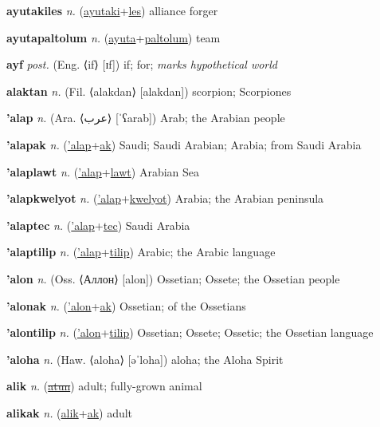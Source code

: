 \textbf{\hypertarget{ayutakiles}{ayutakiles}} \textit{n.} (\hyperlink{ayutaki}{ayutaki}+\allowbreak \hyperlink{les}{les})
alliance forger

\textbf{\hypertarget{ayutapaltolum}{ayutapaltolum}} \textit{n.} (\hyperlink{ayuta}{ayuta}+\allowbreak \hyperlink{paltolum}{paltolum})
team

\textbf{\hypertarget{ayf}{ayf}} \textit{post.} (Eng. ⟨if⟩ [ɪf])
if; for; \textit{marks hypothetical world}

\textbf{\hypertarget{alaktan}{alaktan}} \textit{n.} (Fil. ⟨alakdan⟩ [alakdan])
scorpion; Scorpiones

\textbf{\hypertarget{'alap}{'alap}} \textit{n.} (Ara. ⟨{\arabics{}عرب}⟩ [ˈʕarab])
Arab; the Arabian people

\textbf{\hypertarget{'alapak}{'alapak}} \textit{n.} (\hyperlink{'alap}{'alap}+\allowbreak \hyperlink{ak}{ak})
Saudi; Saudi Arabian; Arabia; from Saudi Arabia

\textbf{\hypertarget{'alaplawt}{'alaplawt}} \textit{n.} (\hyperlink{'alap}{'alap}+\allowbreak \hyperlink{lawt}{lawt})
Arabian Sea

\textbf{\hypertarget{'alapkwelyot}{'alapkwelyot}} \textit{n.} (\hyperlink{'alap}{'alap}+\allowbreak \hyperlink{kwelyot}{kwelyot})
Arabia; the Arabian peninsula

\textbf{\hypertarget{'alaptec}{'alaptec}} \textit{n.} (\hyperlink{'alap}{'alap}+\allowbreak \hyperlink{tec}{tec})
Saudi Arabia

\textbf{\hypertarget{'alaptilip}{'alaptilip}} \textit{n.} (\hyperlink{'alap}{'alap}+\allowbreak \hyperlink{tilip}{tilip})
Arabic; the Arabic language

\textbf{\hypertarget{'alon}{'alon}} \textit{n.} (Oss. ⟨Аллон⟩ [alon])
Ossetian; Ossete; the Ossetian people

\textbf{\hypertarget{'alonak}{'alonak}} \textit{n.} (\hyperlink{'alon}{'alon}+\allowbreak \hyperlink{ak}{ak})
Ossetian; of the Ossetians

\textbf{\hypertarget{'alontilip}{'alontilip}} \textit{n.} (\hyperlink{'alon}{'alon}+\allowbreak \hyperlink{tilip}{tilip})
Ossetian; Ossete; Ossetic; the Ossetian language

\textbf{\hypertarget{'aloha}{'aloha}} \textit{n.} (Haw. ⟨aloha⟩ [əˈloha])
aloha; the Aloha Spirit

\textbf{\hypertarget{alik}{alik}} \textit{n.} (\hyperlink{atun}{\sout{atun}})
adult; fully-grown animal

\textbf{\hypertarget{alikak}{alikak}} \textit{n.} (\hyperlink{alik}{alik}+\allowbreak \hyperlink{ak}{ak})
adult


